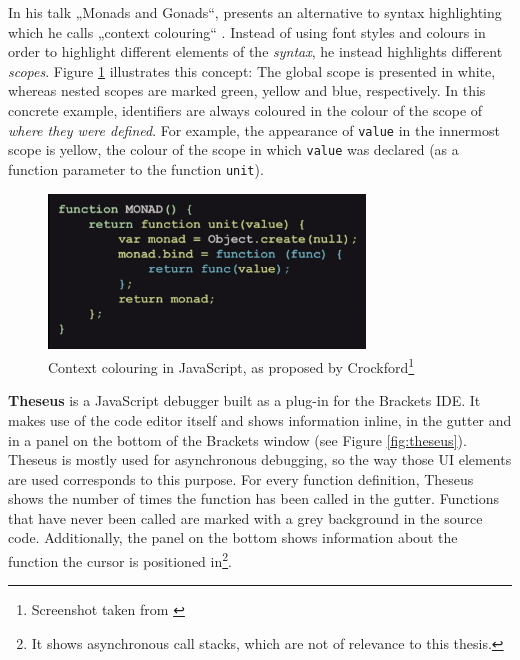 In his talk „Monads and Gonads“,  presents an
alternative to syntax highlighting which he calls „context colouring“
\citeyear{crockford}. Instead of using font styles and colours in order
to highlight different elements of the \emph{syntax}, he instead
highlights different \emph{scopes}. Figure \ref{fig:contexthighlighting}
illustrates this concept: The global scope is presented in white,
whereas nested scopes are marked green, yellow and blue, respectively.
In this concrete example, identifiers are always coloured in the colour
of the scope of \emph{where they were defined}. For example, the
appearance of \texttt{value} in the innermost scope is yellow, the
colour of the scope in which \texttt{value} was declared (as a function
parameter to the function \texttt{unit}).

\begin{figure}[htbp]
\centering
\includegraphics[keepaspectratio,width=0.75\textwidth]{img/context.png}
\caption{Context colouring in JavaScript, as proposed by Crockford\footnote{Screenshot taken from \cite{crockford}}}
\label{fig:contexthighlighting}
\end{figure}

\textbf{Theseus} is a JavaScript debugger built as a plug-in for the
Brackets IDE. It makes use of the code editor itself and shows
information inline, in the gutter and in a panel on the bottom of the
Brackets window (see Figure \ref{fig:theseus}). Theseus is mostly used
for asynchronous debugging, so the way those UI elements are used
corresponds to this purpose. For every function definition, Theseus
shows the number of times the function has been called in the gutter.
Functions that have never been called are marked with a grey background
in the source code. Additionally, the panel on the bottom shows
information about the function the cursor is positioned
in\footnote{It shows asynchronous call stacks, which are not of relevance to this thesis.}.

